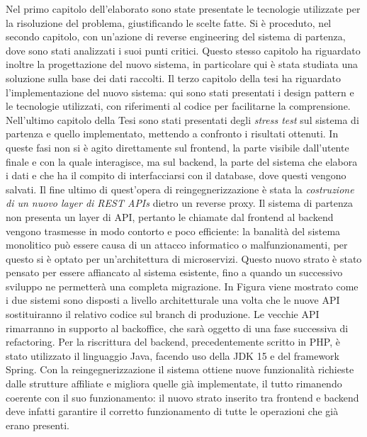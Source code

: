 \documentclass[a4paper,11pt]{article}
\begin{document}
	   Nel primo capitolo dell'elaborato sono state presentate le tecnologie utilizzate per la risoluzione del problema, giustificando le scelte fatte. Si è proceduto, nel secondo capitolo, con un'azione di reverse engineering del sistema di partenza, dove sono stati analizzati i suoi punti critici. Questo stesso capitolo ha riguardato inoltre la progettazione del nuovo sistema, in particolare qui è stata studiata una soluzione sulla base dei dati raccolti. Il terzo capitolo della tesi ha riguardato l'implementazione del nuovo sistema: qui sono stati presentati i design pattern e le tecnologie utilizzati, con riferimenti al codice per facilitarne la comprensione. Nell'ultimo capitolo della Tesi sono stati presentati degli \emph{stress test} sul sistema di partenza e quello implementato, mettendo a confronto i risultati ottenuti. In queste fasi non si è agito direttamente sul frontend, la parte visibile dall’utente finale e con la quale interagisce, ma sul backend, la parte del sistema che elabora i dati e che ha il compito di interfacciarsi con il database, dove questi vengono salvati. Il fine ultimo di quest’opera di reingegnerizzazione è stata la \emph{costruzione di un nuovo layer di REST APIs} dietro un reverse proxy. Il sistema di partenza non presenta un layer di API, pertanto le chiamate dal frontend al backend vengono trasmesse in modo contorto e poco efficiente: la banalità del sistema monolitico può essere causa di un attacco informatico o malfunzionamenti, per questo si è optato per un’architettura di microservizi. Questo nuovo strato è stato pensato per essere affiancato al sistema esistente, fino a quando un successivo sviluppo ne permetterà una completa migrazione. In Figura viene mostrato come i due sistemi sono disposti a livello architetturale una volta che le nuove API sostituiranno il relativo codice sul branch di produzione. Le vecchie API rimarranno in supporto al backoffice, che sarà oggetto di una fase successiva di refactoring. Per la riscrittura del backend, precedentemente scritto in PHP, è stato utilizzato il linguaggio Java, facendo uso della JDK 15 e del framework Spring. Con la reingegnerizzazione il sistema ottiene nuove funzionalità richieste dalle strutture affiliate e migliora quelle già implementate, il tutto rimanendo coerente con il suo funzionamento: il nuovo strato inserito tra frontend e backend deve infatti garantire il corretto funzionamento di tutte le operazioni che già erano presenti. 
\end{document}
